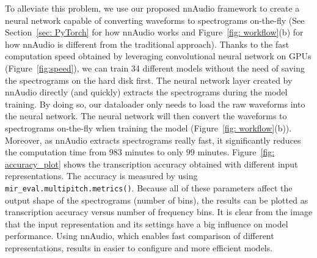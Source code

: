 \documentclass{ieeeaccess}
\newcommand{\nbh}[1]{\texttt{#1}}
\begin{document}
To alleviate this problem, we use our proposed nnAudio framework to create a neural network capable of converting waveforms to spectrograms on-the-fly (See Section~\ref{sec: PyTorch} for how nnAudio works and Figure~\ref{fig: workflow}(b) for how nnAudio is different from the traditional approach). Thanks to the fast computation speed obtained by leveraging convolutional neural network on GPUs (Figure~\ref{fig:speed}), we can train 34 different models without the need of saving the spectrograms on the hard disk first. The neural network layer created by nnAudio directly (and quickly) extracts the spectrograms during the model training. By doing so, our dataloader only needs to load the raw waveforms into the neural network. The neural network will then convert the waveforms to spectrograms on-the-fly when training the model (Figure~\ref{fig: workflow}(b)). Moreover, as nnAudio extracts spectrograms really fast, it significantly reduces the computation time from $983$ minutes to only $99$ minutes. Figure~\ref{fig: accuracy_plot} shows the transcription accuracy obtained with different input representations. The accuracy is measured by using \nbh{mir\_eval.multipitch.metrics()}. Because all of these parameters affect the output shape of the spectrograms (number of bins), the results can be plotted as transcription accuracy versus number of frequency bins. It is clear from the image that the input representation and its settings have a big influence on model performance. Using nnAudio, which enables fast comparison of different representations, results in easier to configure and more efficient models. 
\end{document}
